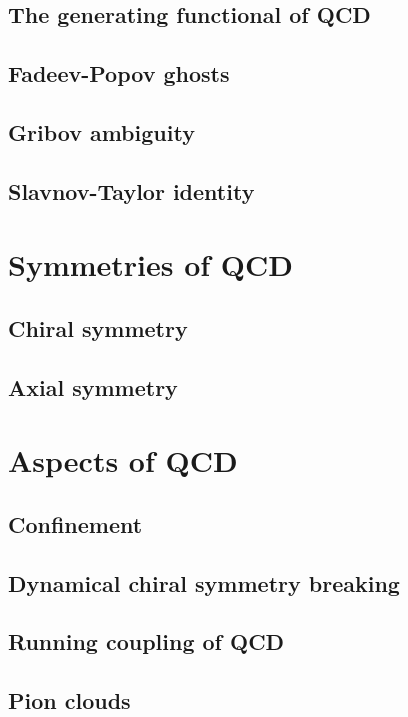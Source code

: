 	\subsection{The generating functional of QCD}
	\subsection{Fadeev-Popov ghosts} 
	\subsection{Gribov ambiguity}
	\subsection{Slavnov-Taylor identity}
	
\section{Symmetries of QCD}
	\subsection{Chiral symmetry}
	\subsection{Axial symmetry}
	
\section{Aspects of QCD}
	\subsection{Confinement}
	\subsection{Dynamical chiral symmetry breaking}
	\subsection{Running coupling of QCD}
	\subsection{Pion clouds}